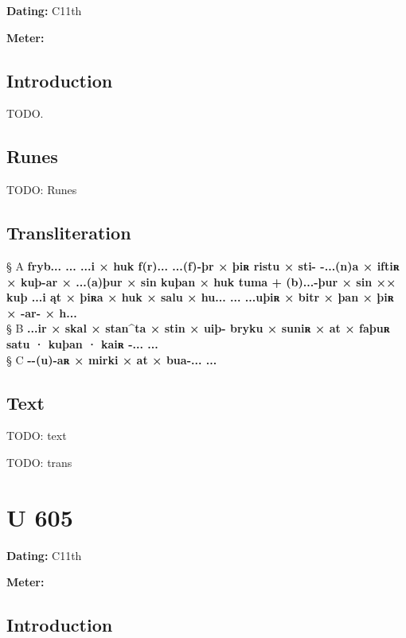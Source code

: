 \begin{flushright}%
\textbf{Dating:} C11th

\textbf{Meter:} \Fornyrdislag
\end{flushright}%

\subsection{Introduction}

TODO.

\subsection{Runes}

TODO: Runes%

\subsection{Transliteration}

§ A \textbf{fryb... ... ...i × huk f(r)... ...(f)-þr × þiʀ ristu × sti- -...(n)a × iftiʀ × kuþ-ar × ...(a)þur × sin kuþan × huk tuma + (b)...-þur × sin ×× kuþ ...i ąt × þiʀa × huk × salu × hu... ... ...uþiʀ × bitr × þan × þiʀ × -ar- × h...} \\
§ B \textbf{...ir × skal × stan\textasciicircum ta × stin × uiþ- bryku × suniʀ × at × faþuʀ satu · kuþan · kaiʀ -... ...} \\
§ C \textbf{-{}-(u)-aʀ × mirki × at × bua-... ...}

\subsection{Text}

\bpg\bpa[0]%
TODO: text\epa

\bpb TODO: trans\epb\epg

\sectionline\clearpage


\section{U 605}

\begin{flushright}%
\textbf{Dating:} C11th

\textbf{Meter:} \Fornyrdislag
\end{flushright}%

\subsection{Introduction}

